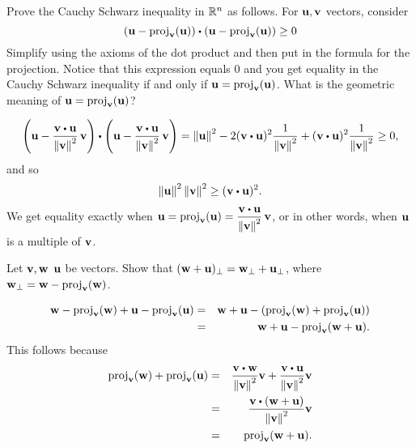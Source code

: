 \begin{ex}
  Prove the Cauchy Schwarz inequality in $\mathbb{R}^n$ as follows.  For
  $\vect{u},\vect{v}$ vectors, consider
  \begin{equation*}
    (\vect{u}-
    \proj_{\vect{v}}(\vect{u})) \dotprod (\vect{u}-
    \proj_{\vect{v}}(\vect{u})) \geq 0
  \end{equation*}
  Simplify using the axioms of the dot product and then put in the
  formula for the projection. Notice that this expression equals $0$
  and you get equality in the Cauchy Schwarz inequality if and only if
  $\vect{u}=\proj_{\vect{v}}(\vect{u})$. What is the geometric
  meaning of $\vect{u}=\proj_{\vect{v}}(\vect{u})$?
  \begin{sol}
    \begin{equation*}
      \paren{\vect{u}-\frac{\vect{v}\dotprod\vect{u}}{\norm{\vect{v}}^2}\,\vect{v}}
      \dotprod
      \paren{\vect{u}-\frac{\vect{v}\dotprod\vect{u}}{\norm{\vect{v}}^2}\,\vect{v}} 
      = \norm{\vect{u}}^2 - 2(\vect{v}\dotprod \vect{u})^2\frac{1}{\norm{\vect{v}}^2}+(\vect{v}\dotprod \vect{u})^2\frac{1}{ \norm{\vect{v}}^2}
      \geq 0,
    \end{equation*}
    and so
    \begin{equation*}
      \norm{\vect{u}}^2\norm{\vect{v}}^2
      \geq (\vect{v}\dotprod \vect{u})^2.
    \end{equation*}
    We get equality exactly when
    $\displaystyle\vect{u}=\proj_{\vect{v}}(\vect{u}) =
    \frac{\vect{v}\dotprod \vect{u}}{\norm{\vect{v}}^2}\,\vect{v}$,
    or in other words, when $\vect{u}$ is a multiple of $\vect{v}$.
  \end{sol}
\end{ex}

\begin{ex}\label{perp-linear}
  Let $\vect{v},\vect{w}$ $\vect{u}$ be vectors. Show that
  $(\vect{w}+\vect{u})_{\perp}=\vect{w}_{\perp}+\vect{u}_{\perp}$,
  where $\vect{w}_{\perp}=\vect{w}-\proj_{\vect{v}}(\vect{w})$.
  \begin{sol}
    \begin{eqnarray*}
      \vect{w}-\proj_{\vect{v}}(\vect{w})+\vect{u}-\proj_{\vect{v}}(\vect{u})
      &=& \vect{w}+\vect{u}-(\proj_{\vect{v}}(\vect{w})+\proj_{\vect{v}}(\vect{u})) \\
      &=&\vect{w}+\vect{u}-\proj_{\vect{v}}(\vect{w}+\vect{u}).
    \end{eqnarray*}
    This follows because
    \begin{eqnarray*}
      \proj_{\vect{v}}(\vect{w})+\proj_{\vect{v}}(\vect{u})
      &=& \frac{\vect{v}\dotprod\vect{w}}{\norm{\vect{v}}^2}\vect{v}
          + \frac{\vect{v}\dotprod\vect{u}}{\norm{\vect{v}}^2}\vect{v} \\
      &=& \frac{\vect{v}\dotprod(\vect{w}+\vect{u})}{\norm{\vect{v}}^2}\vect{v} \\
      &=& \proj_{\vect{v}}(\vect{w}+\vect{u}).
    \end{eqnarray*}
  \end{sol}
\end{ex}

